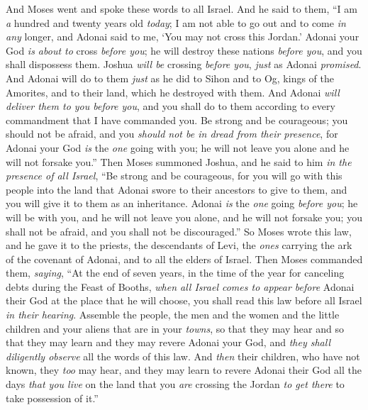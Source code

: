 \begin{biblechapter} %
 And Moses went and spoke these words to all Israel.
\verse And he said to them, “I am \textit{a} hundred and twenty years old \textit{today}; I am not able to go out and to come \textit{in} \textit{any} longer, and Adonai said to me, ‘You may not cross this Jordan.’
\verse Adonai your God \textit{is about to} cross \textit{before you}; he will destroy these nations \textit{before you}, and you shall dispossess them. Joshua \textit{will be} crossing \textit{before you}, \textit{just} as Adonai \textit{promised}.
\verse And Adonai will do to them \textit{just} as he did to Sihon and to Og, kings of the Amorites, and to their land, which he destroyed with them.
\verse And Adonai \textit{will deliver them to you before you}, and you shall do to them according to every commandment that I have commanded you.
\verse Be strong and be courageous; you should not be afraid, and you \textit{should not be in dread from their presence}, for Adonai your God \textit{is} the \textit{one} going with you; he will not leave you alone and he will not forsake you.”
\verse Then Moses summoned Joshua, and he said to him \textit{in the presence of all Israel}, “Be strong and be courageous, for you will go with this people into the land that Adonai swore to their ancestors to give to them, and you will give it to them as an inheritance.
\verse Adonai \textit{is} the \textit{one} going \textit{before you}; he will be with you, and he will not leave you alone, and he will not forsake you; you shall not be afraid, and you shall not be discouraged.”
\verse So Moses wrote this law, and he gave it to the priests, the descendants of Levi, the \textit{ones} carrying the ark of the covenant of Adonai, and to all the elders of Israel.
\verse Then Moses commanded them, \textit{saying}, “At the end of seven years, in the time of the year for canceling debts during the Feast of Booths,
\verse \textit{when all Israel comes to appear before} Adonai their God at the place that he will choose, you shall read this law before all Israel \textit{in their hearing}.
\verse Assemble the people, the men and the women and the little children and your aliens that are in your \textit{towns}, so that they may hear and so that they may learn and they may revere Adonai your God, and \textit{they shall diligently observe} all the words of this law.
\verse And \textit{then} their children, who have not known, they \textit{too} may hear, and they may learn to revere Adonai their God all the days \textit{that you live} on the land that you \textit{are} crossing the Jordan \textit{to get there} to take possession of it.”

\end{biblechapter}

